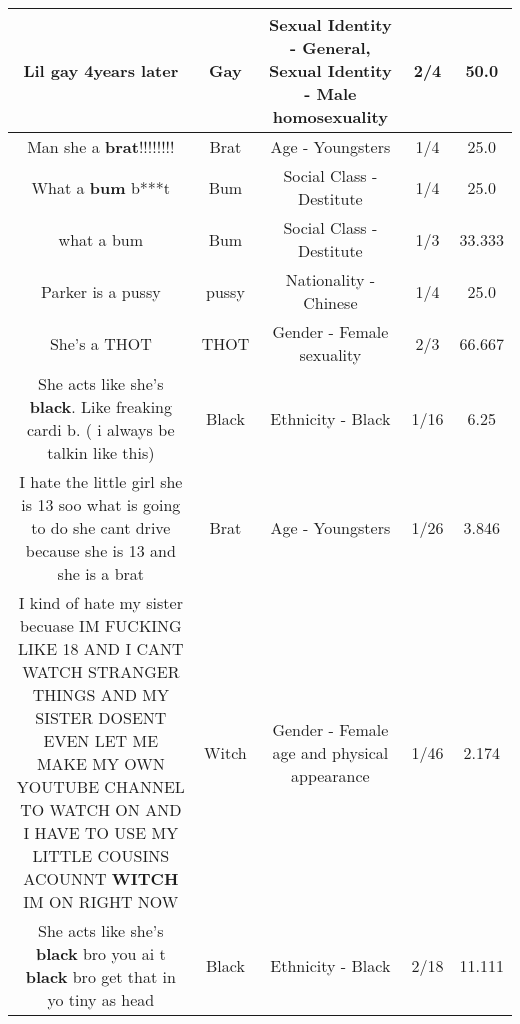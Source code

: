 \documentclass[11pt]{article}
\newlength\mylength
\begin{document}
\begin{center}
\begin{longtable}{|C{.65\mylength}|C{.30\mylength}|C{.12\mylength}|C{.12\mylength}|C{.12\mylength}|}
  \small Lil \textbf{g\textbf{ay}} 4years later\normalsize   & Gay & Sexual Identity - General, Sexual Identity - Male homosexuality & 2/4 & 50.0 \\  \hline
  \small Man she a \textbf{brat}!!!!!!!!\normalsize   & Brat & Age - Youngsters & 1/4 & 25.0 \\  \hline
  \small What a \textbf{bum} b***t\normalsize   & Bum & Social Class - Destitute & 1/4 & 25.0 \\  \hline
  \small what a bum\normalsize   & Bum & Social Class - Destitute & 1/3 & 33.333 \\  \hline
  \small Parker is a pussy\normalsize   & pussy & Nationality - Chinese & 1/4 & 25.0 \\  \hline
  \small She's a THOT\normalsize   & THOT & Gender - Female sexuality & 2/3 & 66.667 \\  \hline
  \small She acts like she's \textbf{black}. Like freaking cardi b. ( i always be talkin like this)\normalsize   & Black & Ethnicity - Black & 1/16 & 6.25 \\  \hline
  \small I hate the little girl she is 13 soo what is going to do she cant drive because she is 13 and she is a brat\normalsize   & Brat & Age - Youngsters & 1/26 & 3.846 \\  \hline
  \small I kind of hate my sister becuase IM FUCKING LIKE 18 AND I CANT WATCH STRANGER THINGS AND MY SISTER DOSENT EVEN LET ME MAKE MY OWN  YOUTUBE CHANNEL TO WATCH ON AND I HAVE TO USE MY LITTLE COUSINS ACOUNNT \textbf{WITCH} IM ON RIGHT NOW\normalsize   & Witch & Gender - Female age and physical appearance & 1/46 & 2.174 \\  \hline
  \small She acts like she's \textbf{black} bro you ai t \textbf{black} bro get that in yo tiny as head\normalsize   & Black & Ethnicity - Black & 2/18 & 11.111 \\  \hline

\end{longtable}
\end{center}
\end{document}
